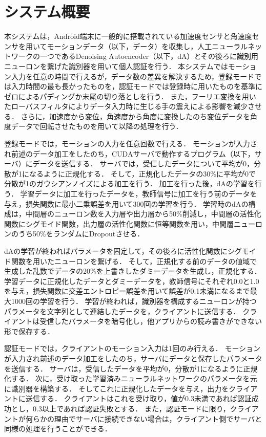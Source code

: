 \section{システム概要}
本システムは，Android端末に一般的に搭載されている加速度センサと角速度センサを用いてモーションデータ（以下，データ）を収集し，人工ニューラルネットワークの一つであるDenoising Autoencoder（以下，dA）とその後ろに識別用ニューロンを繋げた識別器を用いて個人認証を行う．
本システムではモーション入力を任意の時間で行えるが，データ数の差異を解決するため，登録モードでは入力時間の最も長かったものを，認証モードでは登録時に用いたものを基準にゼロによるパディングか末尾の切り落としを行う．
また，フーリエ変換を用いたローパスフィルタによりデータ入力時に生じる手の震えによる影響を減少させる．
さらに，加速度から変位，角速度から角度に変換したのち変位データを角度データで回転させたものを用いて以降の処理を行う．

登録モードでは，モーションの入力を任意回数で行える．
モーションが入力され前述のデータ加工をしたのち，CUDAサーバで動作するプログラム（以下，サーバ）にデータを送信する．
サーバでは，受信したデータについて平均が0，分散が1になるように正規化する．
そして，正規化したデータの30\%に平均が0で分散が1のガウシアンノイズによる加工を行う．
加工を行った後，dAの学習を行う．
学習データに加工を行ったデータを，教師信号に加工を行う前のデータを与え，損失関数に最小二乗誤差を用いて300回の学習を行う．
学習時のdAの構成は，中間層のニューロン数を入力層や出力層から50\%削減し，中間層の活性化関数にシグモイド関数，出力層の活性化関数に恒等関数を用い，中間層ニューロンのうち50\%をランダムにDropoutさせる．

dAの学習が終わればパラメータを固定して，その後ろに活性化関数にシグモイド関数を用いたニューロンを繋げる．
そして，正規化する前のデータの値域で生成した乱数でデータの20\%を上書きしたダミーデータを生成し，正規化する．
学習データに正規化したデータとダミーデータを，教師信号にそれぞれ0.0と1.0を与え，損失関数に交差エントロピー誤差を用いて誤差が0.1未満になるまで最大1000回の学習を行う．
学習が終われば，識別器を構成するニューロンが持つパラメータを文字列として連結したデータを，クライアントに送信する．
クライアントは受信したパラメータを暗号化し，他アプリからの読み書きができない形で保存する．

認証モードでは，クライアントのモーション入力は1回のみ行える．
モーションが入力され前述のデータ加工をしたのち，サーバにデータと保存したパラメータを送信する．
サーバは，受信したデータを平均が0，分散が1になるように正規化する．
次に，受け取った学習済みニューラルネットワークのパラメータを元に識別器を構築する．
そしてこれに正規化したデータを与え，出力をクライアントに送信する．
クライアントはこれを受け取り，値が0.3未満であれば認証成功とし，0.3以上であれば認証失敗とする．
また，認証モードに限り，クライアントが何らかの理由でサーバに接続できない場合は，クライアント側でサーバと同様の処理を行うことができる．
